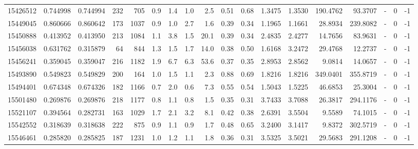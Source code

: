 \begin{tabular}{rrrrrrrrrrrrrrrlrr}
  15426512 & 0.744998 &   0.744994 &  232 &  705 &      0.9 &      1.4 &     1.0 &      2.5 &       0.51 &        0.68 &  1.3475 &  1.3530 &  190.4762 &   93.3707 &             - &        0 &         -1 \\
  15449045 & 0.860666 &   0.860642 &  173 & 1037 &      0.9 &      1.0 &     2.7 &      1.6 &       0.39 &        0.34 &  1.1965 &  1.1661 &   28.8934 &  239.8082 &             - &        0 &         -1 \\
  15450888 & 0.413952 &   0.413950 &  213 & 1084 &      1.1 &      3.8 &     1.5 &     20.1 &       0.39 &        0.34 &  2.4835 &  2.4277 &   14.7656 &   83.9631 &             - &        0 &         -1 \\
  15456038 & 0.631762 &   0.315879 &   64 &  844 &      1.3 &      1.5 &     1.7 &     14.0 &       0.38 &        0.50 &  1.6168 &  3.2472 &   29.4768 &   12.2737 &             - &        0 &         -1 \\
  15456241 & 0.359045 &   0.359047 &  216 & 1182 &      1.9 &      6.7 &     6.3 &     53.6 &       0.37 &        0.35 &  2.8953 &  2.8562 &    9.0814 &   14.0657 &             - &        0 &         -1 \\
  15493890 & 0.549823 &   0.549829 &  200 &  164 &      1.0 &      1.5 &     1.1 &      2.3 &       0.88 &        0.69 &  1.8216 &  1.8216 &  349.0401 &  355.8719 &             - &        0 &         -1 \\
  15494401 & 0.674348 &   0.674326 &  182 & 1166 &      0.7 &      2.0 &     0.6 &      7.3 &       0.55 &        0.54 &  1.5043 &  1.5225 &   46.6853 &   25.3004 &             - &        0 &         -1 \\
  15501480 & 0.269876 &   0.269876 &  218 & 1177 &      0.8 &      1.1 &     0.8 &      1.5 &       0.35 &        0.31 &  3.7433 &  3.7088 &   26.3817 &  294.1176 &             - &        0 &         -1 \\
  15521107 & 0.394564 &   0.282731 &  163 & 1029 &      1.7 &      2.1 &     3.2 &      8.1 &       0.42 &        0.38 &  2.6391 &  3.5504 &    9.5589 &   74.1015 &             - &        0 &         -1 \\
  15542552 & 0.318639 &   0.318638 &  222 &  875 &      0.9 &      1.1 &     0.9 &      1.7 &       0.48 &        0.65 &  3.2400 &  3.1417 &    9.8372 &  302.5719 &             - &        0 &         -1 \\
  15546461 & 0.285820 &   0.285825 &  187 & 1231 &      1.0 &      1.2 &     1.1 &      1.8 &       0.36 &        0.31 &  3.5325 &  3.5021 &   29.5683 &  291.1208 &             - &        0 &         -1 \\

\end{tabular}
